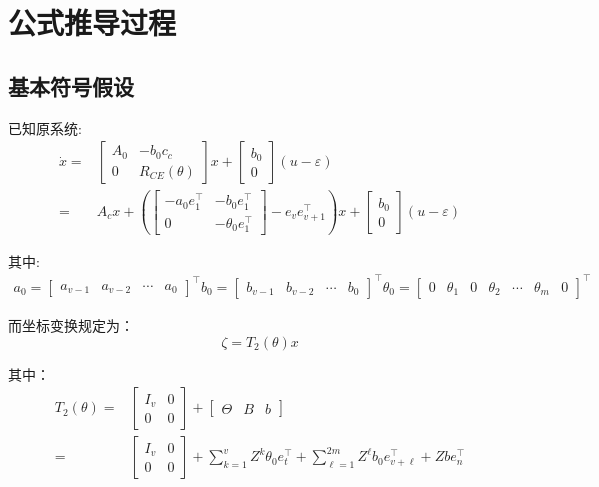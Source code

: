 \documentclass[a4paper,12pt]{article}
\begin{document}
\section*{公式推导过程}
\subsection*{基本符号假设}
已知原系统:
\begin{align*}
    \dot{x} = &
    \begin{bmatrix}
        A_0 & -b_0c_c \\
        0 & R_{CE}(\theta)
    \end{bmatrix} x + 
    \begin{bmatrix}
        b_0 \\ 0
    \end{bmatrix} (u-\varepsilon)
    \\ = &
    A_c x + 
    \left(
        \left[
        \begin{array}{c|c}
        -a_0e_1^\top & -b_0e_1^\top\\ \hline
        0 & -\theta_0e_1^\top 
        \end{array}
        \right]
        - e_ve_{v+1}^\top
    \right)
     x + 
    \begin{bmatrix}
        b_0 \\ 0
    \end{bmatrix} (u-\varepsilon)
\end{align*}

其中:
\begin{align*}
    a_0 = 
    \begin{bmatrix}
        a_{v-1} & a_{v-2} & \cdots & a_0    
    \end{bmatrix}^\top
    b_0 = 
    \begin{bmatrix}
        b_{v-1} & b_{v-2} & \cdots & b_0    
    \end{bmatrix}^\top
    \theta_0 = 
    \begin{bmatrix}
        0 & \theta_{1} & 0 & \theta_{2} & \cdots & \theta_m & 0    
    \end{bmatrix}^\top
\end{align*}

而坐标变换规定为：
\[
    \zeta = T_2(\theta) x
\]

其中：
\begin{align*}
    T_2(\theta) = &
    \begin{bmatrix}
        I_{v} & 0 \\
        0 & 0
    \end{bmatrix} + 
    \left[
    \begin{array}{c|cc}
    \Theta & B & b
    \end{array}
    \right]
    \\ = &
    \begin{bmatrix}
        I_{v} & 0 \\ 
        0 & 0
    \end{bmatrix}
    + \sum_{k=1}^{v} Z^k \theta_0 e_t^\top
    + \sum_{\ell=1}^{2m} Z^{\ell} b_0 e_{v+\ell}^\top
    + Z b e_n^\top
\end{align*}
\end{document}
